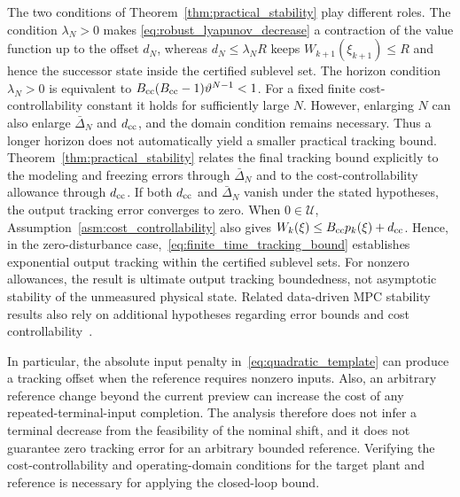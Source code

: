 \documentclass[journal]{IEEEtran}
\theoremstyle{plain}
\theoremstyle{definition}
\theoremstyle{definition}
\begin{document}
The two conditions of Theorem~\ref{thm:practical_stability} play
different roles. The condition $\lambda_N>0$ makes
\eqref{eq:robust_lyapunov_decrease} a contraction of the value function
up to the offset $d_N$, whereas $d_N\le\lambda_NR$ keeps
$W_{k+1}(\xi_{k+1})\le R$ and hence the successor state inside the
certified sublevel set. The horizon condition $\lambda_N>0$ is
equivalent to
$B_{\rm cc}(B_{\rm cc}-1)\vartheta^{N-1}<1$. For a fixed finite
cost-controllability constant it holds for sufficiently large $N$.
However, enlarging $N$ can also enlarge $\bar\Delta_N$ and
$d_{\rm cc}$, and the domain condition remains necessary. Thus a longer
horizon does not automatically yield a smaller practical tracking
bound. Theorem~\ref{thm:practical_stability} relates the final tracking
bound explicitly to the modeling and freezing errors through
$\bar\Delta_N$ and to the cost-controllability allowance through
$d_{\rm cc}$. If both $d_{\rm cc}$ and $\bar\Delta_N$ vanish under the stated
hypotheses, the output tracking error converges to zero. When $0\in\mathcal U$, Assumption~\ref{asm:cost_controllability}
also gives $W_k(\xi)\le B_{\rm cc}p_k(\xi)+d_{\rm cc}$. Hence, in the
zero-disturbance case,~\eqref{eq:finite_time_tracking_bound} establishes
exponential output tracking within the certified sublevel sets. For
nonzero allowances, the result is ultimate output tracking boundedness,
not asymptotic stability of the unmeasured physical state. Related data-driven MPC stability results
also rely on additional hypotheses regarding error bounds and cost
controllability~\cite{schimperna2026data,liu2026lpv}.

In particular, the absolute input penalty in~\eqref{eq:quadratic_template}
can produce a tracking offset when the reference requires nonzero
inputs. Also, an arbitrary reference change beyond the current preview
can increase the cost of any repeated-terminal-input completion. The
analysis therefore does not infer a terminal decrease from the
feasibility of the nominal shift, and it does not guarantee zero
tracking error for an arbitrary bounded reference. Verifying the
cost-controllability and operating-domain conditions for the target
plant and reference is necessary for applying the closed-loop bound.

\endgroup
\end{document}
